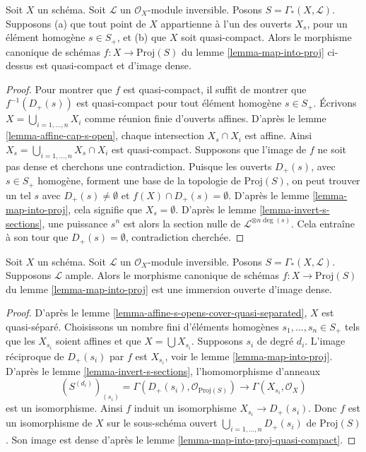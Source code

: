 \begin{lemma}
\label{lemma-map-into-proj-quasi-compact}
Soit $X$ un schéma. Soit $\mathcal{L}$ un $\mathcal{O}_X$-module inversible.
Posons $S = \Gamma_*(X, \mathcal{L})$.
Supposons (a) que tout point de $X$ appartienne à l'un des
ouverts $X_s$, pour un élément homogène $s \in S_{+}$,
et (b) que $X$ soit quasi-compact. Alors le morphisme canonique de schémas
$f : X \longrightarrow \text{Proj}(S)$ du lemme \ref{lemma-map-into-proj}
ci-dessus est quasi-compact et d'image dense.
\end{lemma}

\begin{proof}
Pour montrer que $f$ est quasi-compact, il suffit de montrer que $f^{-1}(D_{+}(s))$
est quasi-compact pour tout élément homogène $s \in S_{+}$. Écrivons
$X = \bigcup_{i = 1, \ldots, n} X_i$ comme réunion finie
d'ouverts affines. D'après le lemme \ref{lemma-affine-cap-s-open}, chaque intersection
$X_s \cap X_i$ est affine. Ainsi $X_s = \bigcup_{i = 1, \ldots, n} X_s \cap X_i$
est quasi-compact. Supposons que l'image de $f$ ne soit pas dense et cherchons
une contradiction. Puisque les ouverts $D_+(s)$, avec $s \in S_+$ homogène,
forment une base de la topologie de $\text{Proj}(S)$, on peut trouver
un tel $s$ avec $D_+(s) \not = \emptyset$ et $f(X) \cap D_+(s) = \emptyset$.
D'après le lemme \ref{lemma-map-into-proj},
cela signifie que $X_s = \emptyset$. D'après le lemme \ref{lemma-invert-s-sections},
une puissance $s^n$ est alors la section nulle de
$\mathcal{L}^{\otimes n\deg(s)}$.
Cela entraîne à son tour que $D_+(s) = \emptyset$, contradiction
cherchée.
\end{proof}

\begin{lemma}
\label{lemma-ample-immersion-into-proj}
Soit $X$ un schéma. Soit $\mathcal{L}$ un $\mathcal{O}_X$-module inversible.
Posons $S = \Gamma_*(X, \mathcal{L})$.
Supposons $\mathcal{L}$ ample. Alors le morphisme canonique de schémas
$f : X \longrightarrow \text{Proj}(S)$ du lemme \ref{lemma-map-into-proj}
est une immersion ouverte d'image dense.
\end{lemma}

\begin{proof}
D'après le lemme \ref{lemma-affine-s-opens-cover-quasi-separated},
$X$ est quasi-séparé. Choisissons un nombre fini d'éléments
homogènes $s_1, \ldots, s_n \in S_{+}$
tels que les $X_{s_i}$ soient affines et que $X = \bigcup X_{s_i}$.
Supposons $s_i$ de degré $d_i$. L'image réciproque de
$D_{+}(s_i)$ par $f$ est $X_{s_i}$, voir le lemme \ref{lemma-map-into-proj}.
D'après le lemme \ref{lemma-invert-s-sections}, l'homomorphisme d'anneaux
$$
(S^{(d_i)})_{(s_i)} = \Gamma(D_{+}(s_i), \mathcal{O}_{\text{Proj}(S)})
\longrightarrow
\Gamma(X_{s_i}, \mathcal{O}_X)
$$
est un isomorphisme. Ainsi $f$ induit un isomorphisme
$X_{s_i} \to D_{+}(s_i)$. Donc $f$ est un isomorphisme de $X$ sur le sous-schéma
ouvert $\bigcup_{i = 1, \ldots, n} D_{+}(s_i)$ de $\text{Proj}(S)$.
Son image est dense d'après le lemme \ref{lemma-map-into-proj-quasi-compact}.
\end{proof}


